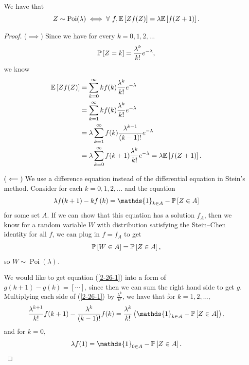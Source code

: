 \begin{lemma}
	We have that \[
		Z \sim \operatorname{Poi}(\lambda) \iff \forall\ f, \E\left[Zf(Z)\right] = \lambda \E\left[f(Z+1)\right] 
	.\] 
\end{lemma}
\begin{proof}
	($\implies$) Since we have for every $k = 0,1,2,\ldots$ \[
		\P\left[Z = k\right] = \frac{\lambda^k}{k!} e^{-\lambda}
	,\] we know
	\begin{align*}
		\E\left[Zf(Z)\right]
		&= \sum\limits_{k=0}^{\infty} kf(k) \frac{\lambda^k}{k!} e^{-\lambda} \\
		&= \sum\limits_{k=1}^{\infty} k f(k) \frac{\lambda^k}{k!} e^{-\lambda} \\
		&= \lambda \sum\limits_{k=1}^{\infty} f(k) \frac{\lambda^{k-1}}{(k-1)!} e^{-\lambda} \\
		&= \lambda \sum\limits_{k=0}^{\infty} f(k+1) \frac{\lambda^k}{k!} e^{-\lambda} = \lambda \E\left[f(Z+1)\right] 
	.\end{align*}

	($\impliedby$) We use a difference equation instead of the differential equation in Stein's method. Consider for each $k=0,1,2,\ldots$ and the equation 
	\begin{equation} \label{2-26-1}
		\lambda f(k+1) - kf\left( k \right) = \mathds{1}_{k \in A} - \P\left[Z \in A\right] 
	\end{equation}for some set $A$.
	If we can show that this equation has a solution $f_A$, then we know for a random variable $W$ with distribution satisfying the Stein--Chen identity for all $f$, we can plug in $f = f_A$ to get \[
		\P\left[W \in A\right] = \P\left[Z \in A\right] 
	,\] so $W \sim \operatorname{Poi}(\lambda)$.

	We would like to get equation (\ref{2-26-1}) into a form of $g(k+1) - g(k) = [\cdots]$, since then we can sum the right hand side to get $g$. Multiplying each side of (\ref{2-26-1}) by $\frac{\lambda^k}{k!}$, we have that for $k=1,2,\ldots$,
	\begin{equation}
		\frac{\lambda^{k+1}}{k!} f(k+1) - \frac{\lambda^k}{(k-1)!} f(k) = \frac{\lambda^k}{k!} \left( \mathds{1}_{k \in A} - \P\left[Z \in A\right]  \right)
	,\end{equation}
	and for $k=0$, \[
		\lambda f(1) = \mathds{1}_{0 \in A} - \P\left[Z \in A\right] 
	.\] 


\end{proof}
